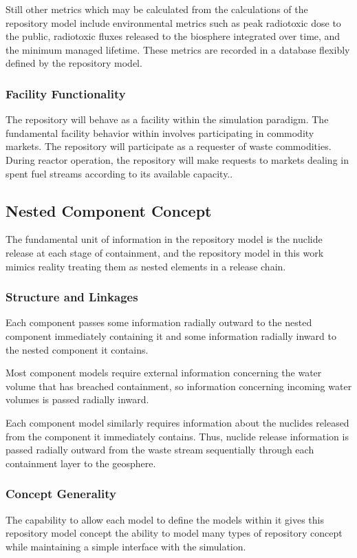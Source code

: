 Still other metrics which may be calculated from the calculations of 
the repository model include environmental metrics such as peak 
radiotoxic dose to the public, radiotoxic fluxes released to the 
biosphere integrated over time, and the minimum managed lifetime.  
These metrics are recorded in a database flexibly defined by the repository 
model.

\subsubsection{Facility Functionality}
The repository will behave as a facility within the \Cyclus simulation 
paradigm. The fundamental facility behavior within \Cyclus involves 
participating in commodity markets. The repository will participate as 
a requester of waste commodities. During reactor operation, the 
repository will make requests to markets dealing in spent fuel streams 
according to its available capacity..

\subsection{Nested Component Concept}
The fundamental unit of information in the repository model is the 
nuclide release at each stage of containment, and the repository model 
in this work mimics reality treating them as nested elements in a 
release chain.

\subsubsection{Structure and Linkages}
Each component passes some information radially outward to the nested 
component immediately containing it and some information radially 
inward to the nested component it contains.

Most component models require external information concerning the 
water volume that has breached containment, so information concerning 
incoming water volumes is passed radially inward. 

Each component model similarly requires information about the nuclides 
released from the component it immediately contains.  Thus, nuclide 
release information is passed radially outward from the waste stream 
sequentially through each containment layer to the geosphere.

\subsubsection{Concept Generality}
The capability to allow each model to define the models within it gives this 
repository model concept the ability to model many types of repository concept 
while maintaining a simple interface with the simulation. 

